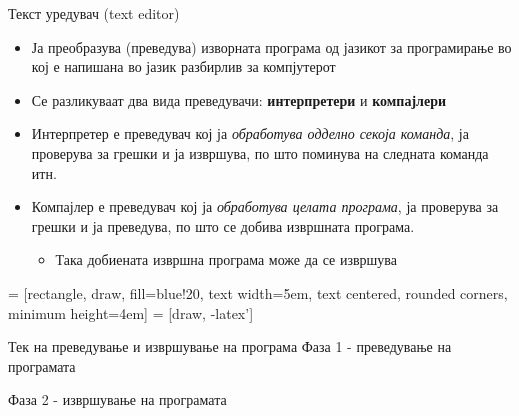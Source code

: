\begin{frame}{Текст уредувач (text editor)}
\begin{itemize}
  \item Ја преобразува (преведува) изворната програма од јазикот за програмирање во кој е напишана во јазик разбирлив за компјутерот
  \item Се разликуваат два вида преведувачи: \textbf{интерпретери} и \textbf{компајлери} 
  \item Интерпретер е преведувач кој ја \emph{обработува одделно секоја команда}, ја
  проверува за грешки и ја извршува, по што поминува на следната команда  итн.
  \item Компајлер е преведувач кој ја \emph{обработува целата програма}, ја проверува
  за грешки и ја преведува, по што се добива извршната програма.
  \begin{itemize}
  \item Така добиената извршна програма може да се извршува
  \end{itemize}
\end{itemize}
\end{frame}

 = [rectangle, draw, fill=blue!20,
text width=5em, text centered, rounded corners, minimum height=4em]
 = [draw, -latex']

\begin{frame}[fragile,shrink=20]{Тек на преведување и извршување на програма}
Фаза 1 - преведување на програмата
\begin{center}
\end{center}
Фаза 2 - извршување на програмата
\begin{center}
\end{center}
\end{frame}

